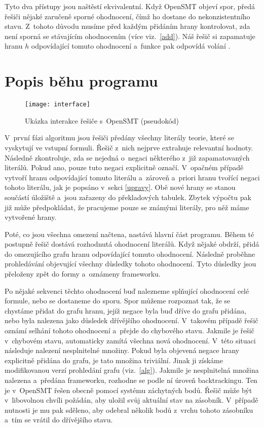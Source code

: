 Tyto dva přístupy jsou naštěstí ekvivalentní. Když OpenSMT objeví spor, předá řešiči nějaké zaručeně sporné ohodnocení, čímž ho dostane do nekonzistentního stavu. Z~tohoto důvodu musíme před každým přidáním hrany kontrolovat, zda není sporná se stávajícím ohodnocením (více viz.~\ref{add}). Náš řešič si zapamatuje hranu $h$ odpovídající tomuto ohodnocení a~funkce  pak odpovídá volání . 

\section{Popis běhu programu}

\begin{figure}
	\centering
	\texttt{[image: interface]}
	\caption{Ukázka interakce řešiče s~OpenSMT (pseudokód)}
\end{figure}

V~první fázi algoritmu jsou řešiči předány všechny literály teorie, které se vyskytují ve vstupní formuli. Řešič z~nich nejprve extrahuje relevantní hodnoty. Následně zkontroluje, zda se nejedná o~negaci některého z~již zapamatovaných literálů. Pokud ano, pouze tuto negaci explicitně označí. V~opačném případě vytvoří hranu odpovídající tomuto literálu a~zároveň a~priori hranu tvořící negaci tohoto literálu, jak je popsáno v~sekci \ref{upravy}. Obě nové hrany se stanou součástí úložiště a~jsou zařazeny do překladových tabulek. Zbytek výpočtu pak již může předpokládat, že pracujeme pouze se známými literály, pro něž máme vytvořené hrany.

Poté, co jsou všechna omezení načtena, nastává hlavní část programu. Během té postupně řešič dostává rozhodnutá ohodnocení literálů. Když nějaké obdrží, přidá do omezujícího grafu hranu odpovídající tomuto ohodnocení. Následně proběhne prohledávání objevující všechny důsledky tohoto ohodnocení. Tyto důsledky jsou přeloženy zpět do formy  a~oznámeny frameworku.

Po nějaké sekvenci těchto ohodnocení buď nalezneme splňující ohodnocení celé formule, nebo se dostaneme do sporu. Spor můžeme rozpoznat tak, že se chystáme přidat do grafu hranu, jejíž negace byla buď dříve do grafu přidána, nebo byla nalezena jako důsledek dřívějšího ohodnocení. V~takovém případě řešič oznámí selhání tohoto ohodnocení a~přejde do chybového stavu. Jakmile je řešič v~chybovém stavu, automaticky zamítá všechna nová ohodnocení. V~této situaci následuje nalezení nesplnitelné množiny. Pokud byla objevená negace hrany explicitně přidána do grafu, je tato množina triviální. Jinak ji získáme modifikovanou verzí prohledání grafu (viz.~\ref{alg}). Jakmile je nesplnitelná množina nalezena a~předána frameworku, rozhodne se podle ní úroveň backtrackingu. Ten je v~OpenSMT řešen obecně pomocí systému záchytných bodů. Řešič může být v~libovolnou chvíli požádán, aby uložil svůj aktuální stav na zásobník. V~případě nutnosti je mu pak sděleno, aby odebral několik bodů z~vrchu tohoto zásobníku a~tím se vrátil do dřívějšího stavu. 

